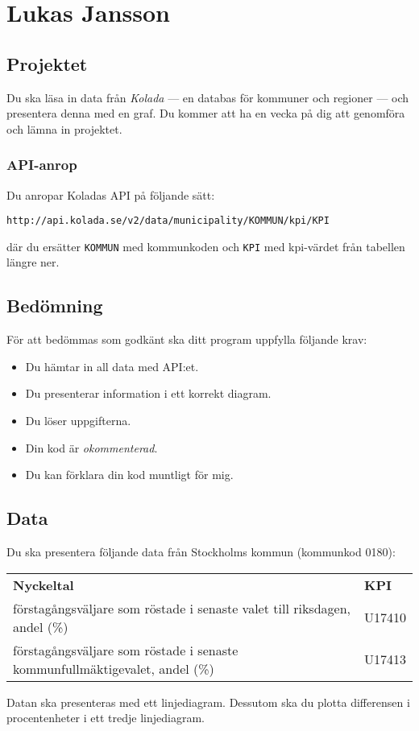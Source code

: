 \section{Lukas Jansson}

\subsection{Projektet}

Du ska läsa in data från \textit{Kolada} --- en databas för kommuner och regioner --- och presentera denna med en graf. Du kommer att ha en vecka på dig att genomföra och lämna in projektet.

\subsubsection{API-anrop}

Du anropar Koladas API på följande sätt:

\texttt{http://api.kolada.se/v2/data/municipality/KOMMUN/kpi/KPI}

\noindent där du ersätter \texttt{KOMMUN} med kommunkoden och \texttt{KPI} med kpi-värdet från tabellen längre ner.

\subsection{Bedömning}

För att bedömmas som godkänt ska ditt program uppfylla följande krav:

\begin{itemize}
	\item Du hämtar in all data med API:et.
	\item Du presenterar information i ett korrekt diagram.
	\item Du löser uppgifterna.
	\item Din kod är \textit{okommenterad}.
	\item Du kan förklara din kod muntligt för mig.
\end{itemize}

\subsection{Data}

Du ska presentera följande data från Stockholms kommun (kommunkod 0180):

\begin{center}
	\begin{tabular}{ll}
		\rowcolor{blue!25}
		\textbf{Nyckeltal} & \textbf{KPI}\\
		förstagångsväljare som röstade i senaste valet till riksdagen, andel (\%) & U17410\\
		förstagångsväljare som röstade i senaste kommunfullmäktigevalet, andel (\%) & U17413\\
	\end{tabular}
\end{center}

Datan ska presenteras med ett linjediagram. Dessutom ska du plotta differensen i procentenheter i ett tredje linjediagram.

\clearpage